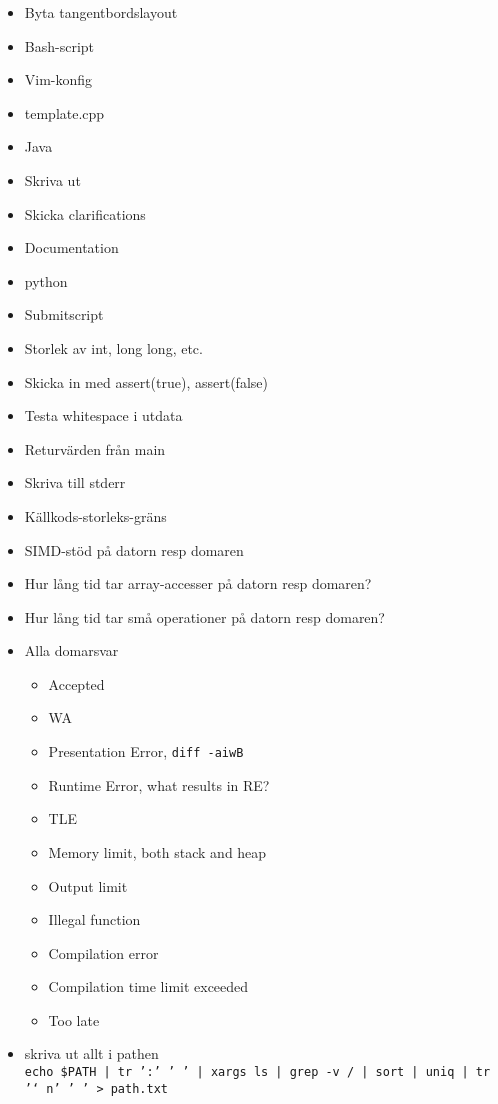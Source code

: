 \begin{itemize}
	\item Byta tangentbordslayout
	\item Bash-script
	\item Vim-konfig
	\item template.cpp
	\item Java
	\item Skriva ut
	\item Skicka clarifications
	\item Documentation
	\item python
	\item Submitscript
	\item Storlek av int, long long, etc.
	\item Skicka in med assert(true), assert(false)
	\item Testa whitespace i utdata
	\item Returvärden från main
	\item Skriva till stderr
	\item Källkods-storleks-gräns
	\item SIMD-stöd på datorn resp domaren
	\item Hur lång tid tar array-accesser på datorn resp domaren?
	\item Hur lång tid tar små operationer på datorn resp domaren?
	\item Alla domarsvar
		\begin{itemize}
			\item Accepted
			\item WA
			\item Presentation Error, \texttt{diff -aiwB}
			\item Runtime Error, what results in RE?
			\item TLE
			\item Memory limit, both stack and heap
			\item Output limit
			\item Illegal function
			\item Compilation error
			\item Compilation time limit exceeded
			\item Too late
		\end{itemize}
	\item skriva ut allt i pathen\\
		\texttt{echo \$PATH | tr ':' ' ' | xargs ls | grep -v / | sort | uniq | tr '\char`\\n' ' ' > path.txt}
\end{itemize}
